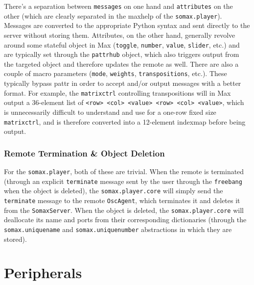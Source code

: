 There's a separation between \texttt{messages} on one hand and \texttt{attributes} on the other (which are clearly separated in the maxhelp of the \texttt{somax.player}). Messages are converted to the appropriate Python syntax and sent directly to the server without storing them. Attributes, on the other hand, generally revolve around some stateful object in Max (\texttt{toggle}, \texttt{number}, \texttt{value}, \texttt{slider}, etc.) and are typically set through the \texttt{pattrhub} object, which also triggers output from the targeted object and therefore updates the remote as well. There are also a couple of macro parameters (\texttt{mode}, \texttt{weights}, \texttt{transpositions}, etc.). These typically bypass pattr in order to accept and/or output messages with a better format. For example, the \texttt{matrixctrl} controlling transpositions will in Max output a 36-element list of \texttt{<row> <col> <value> <row> <col> <value>}, which is unnecessarily difficult to understand and use for a one-row fixed size \texttt{matrixctrl}, and is therefore converted into a 12-element indexmap before being output.


\subsubsection{Remote Termination \& Object Deletion}

For the \texttt{somax.player}, both of these are trivial. When the remote is terminated (through an explicit \texttt{terminate} message sent by the user through the \texttt{freebang} when the object is deleted), the \texttt{somax.player.core} will simply send the \texttt{terminate} message to the remote \texttt{OscAgent}, which terminates it and deletes it from the \texttt{SomaxServer}. When the object is deleted, the \texttt{somax.player.core} will deallocate its name and ports from their corresponding dictionaries (through the \texttt{somax.uniquename} and \texttt{somax.uniquenumber} abstractions in which they are stored).





\section{Peripherals}\label{ssec:3-peripherals}

